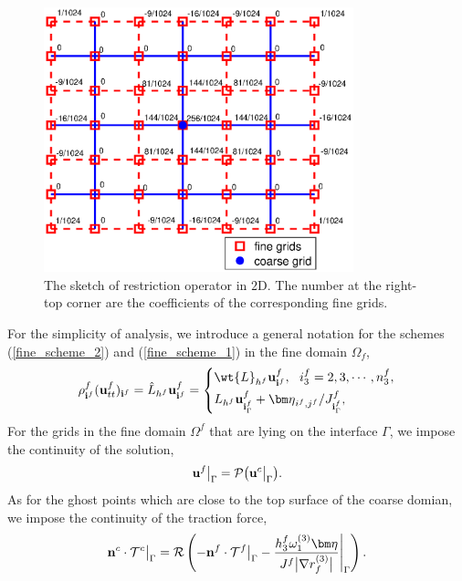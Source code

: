 \begin{figure}[htbp]
	\centering
	\includegraphics[width=0.8\textwidth]{restriction1.eps}
	\caption{The sketch of restriction operator in $2$D. The number at the right-top corner are the coefficients of the corresponding fine grids.}\label{extrapolation}
\end{figure}
For the simplicity of analysis, we introduce a general notation for the schemes (\ref{fine_scheme_2}) and (\ref{fine_scheme_1}) in the fine domain $\Omega_f$,
\begin{align}\label{fine_scheme}
\rho^f_{{\bf i}^f} ({\bf u}_{tt}^f)_{{\bf i}^f} = \hat{L}_{h^f}{\bf u}^f_{{\bf i}^f} =  \left\{
\begin{aligned}
&\wt{L}_{h^f}{\bf{u}}^f_{{\bf i}^f}, \ \ i_3^f = 2,3,\cdots,n_3^f,\\
&L_{h^f}{\bf u}^f_{{\bf i}^f_{\Gamma}}+{\bm \eta}_{i^f,j^f}/J^f_{{\bf i}^f_{\Gamma}},
\end{aligned}
\right.
\end{align}
For the grids in the fine domain $\Omega^f$  that are lying on the interface $\Gamma$, we impose the continuity of the solution,
\begin{equation}\label{data_continuous_curvi}
{\bf u}^f\big|_{\Gamma} = \mathcal{P}\big({\bf u}^c\big|_{\Gamma}\big).
\end{equation}
As for the ghost points which are close to the top surface of the coarse domian, we impose the continuity of the traction force,
\begin{equation}\label{traction_continuous_curvi}
{\bf n}^c\cdot\mathcal{T}^c \big|_\Gamma = \mathcal{R}\left(-{\bf n}^f\cdot\mathcal{T}^f\big|_\Gamma - \frac{h_3^f\omega_1^{(3)}{\bm \eta}}{J^f\big|\nabla r_f^{(3)}\big|}\Bigg|_\Gamma\right).
\end{equation}